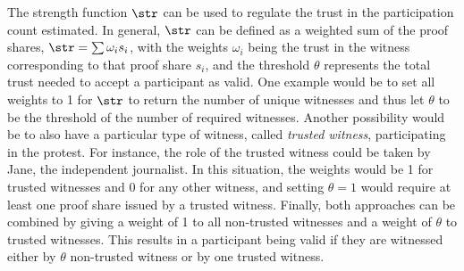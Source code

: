 The strength function \(\str\) can be used to regulate the trust in the 
participation count estimated. In general, \(\str\) can be defined as a 
weighted sum of the proof shares, \(\str = \sum \omega_i s_i\), with the 
weights \(\omega_i\) being the trust in the witness corresponding to that proof 
share \(s_i\), and the threshold \(\theta\) represents the total trust needed 
to accept a participant as valid.
One example would be to set all weights to 1 for \(\str\) to return the number of unique witnesses and thus let \(\theta\) to be the threshold of the number of required witnesses.
Another possibility would be to also have a particular type of witness, called \emph{trusted witness}, participating in the protest. 
For instance, the role of the trusted witness could be taken by Jane, the independent journalist. 
In this situation, the weights would be 1 for trusted witnesses and 0 for any other witness, and
setting \(\theta = 1\) would require at least one proof share issued by a trusted witness.
Finally, both approaches can be combined by giving a weight of 1 to all 
non-trusted witnesses and a weight of \(\theta\) to trusted witnesses. This 
results in a participant being valid if they are witnessed either by \(\theta\) 
non-trusted witness or by one trusted witness.

